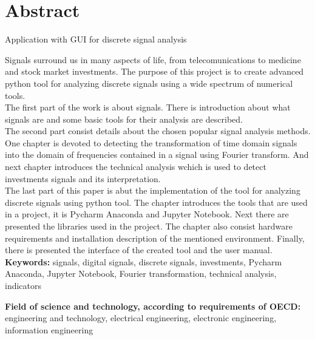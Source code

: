 \chapter*{Abstract}
\centerline{Application with GUI for discrete signal analysis}
\vspace{0.5cm}
\indent Signals surround us in many aspects of life, from telecomunications to medicine and stock market investments. The purpose of this project is to create advanced python tool for analyzing discrete signals using a wide spectrum of numerical tools.  \\
\indent The first part of the work is about signals. There is introduction about what signals are and some basic tools for their analysis are described. \\
\indent The second part consist details about the chosen popular signal analysis methods. One chapter is devoted to detecting the transformation of time domain signals into the domain of frequencies contained in a signal using Fourier transform. And next chapter introduces the technical analysis wchich is used to detect investments signals and its interpretation. \\
\indent  The last part of this paper is abut the implementation of the tool for analyzing discrete signals using python tool. The chapter introduces the tools that are used in a project, it is Pycharm Anaconda and Jupyter Notebook. Next there are presented the libraries used in the project. The chapter also consist hardware requirements and installation description of the mentioned environment. Finally, there is presented the interface of the created tool and the user manual.\\
\vspace{0.5cm}\newline
\textbf{Keywords:} signals, digital signals, discrete signals, investments, Pycharm Anaconda, Jupyter Notebook, Fourier transformation, technical analysis, indicators \vspace{0.5cm}

\noindent \textbf{Field of science and technology, according to requirements of OECD:} engineering and technology, electrical engineering, electronic engineering, information engineering